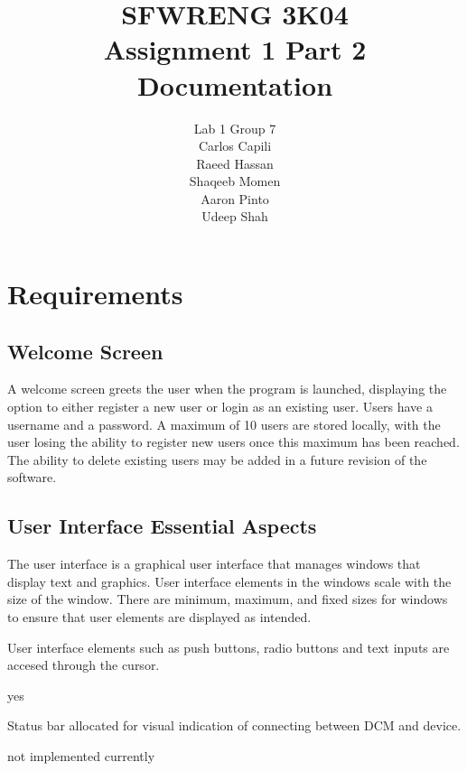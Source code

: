 \documentclass[12pt]{article}
\title{SFWRENG 3K04 \\ Assignment 1 Part 2 \\ Documentation}
\author{
    Lab 1 Group 7 \\
    Carlos Capili \\
    Raeed Hassan \\
    Shaqeeb Momen \\
    Aaron Pinto \\
    Udeep Shah
}
\date{}
\begin{document}
\maketitle \newpage
\tableofcontents \newpage

\section{Requirements}
\subsection{Welcome Screen}
A welcome screen greets the user when the program is launched, displaying the option to either register a new user or login as an existing user. Users have a username and a password. A maximum of 10 users are stored locally, with the user losing the ability to register new users once this maximum has been reached. The ability to delete existing users may be added in a future revision of the software.

\subsection{User Interface Essential Aspects}
The user interface is a graphical user interface that manages windows that display text and graphics. User interface elements in the windows scale with the size of the window. There are minimum, maximum, and fixed sizes for windows to ensure that user elements are displayed as intended.

User interface elements such as push buttons, radio buttons and text inputs are accesed through the cursor.

yes

Status bar allocated for visual indication of connecting between DCM and device.

not implemented currently
\end{document}
